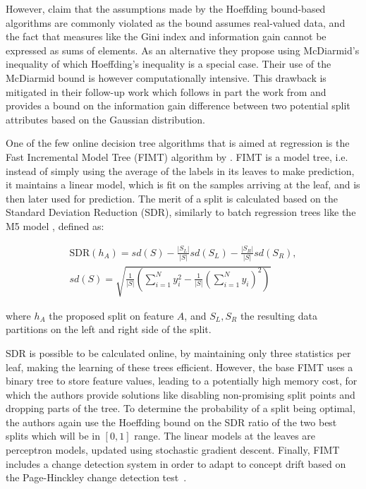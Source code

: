 However, \citet{vfdt-mcdiarmid} claim that the assumptions made
by the Hoeffding bound-based algorithms are commonly violated as the bound assumes
real-valued data, and the fact that measures like the Gini index and information
gain cannot be expressed as sums of elements. As an alternative they propose
using McDiarmid's inequality of which Hoeffding's inequality is a special case.
Their use of the McDiarmid
bound is however computationally intensive. This drawback is mitigated
in their follow-up work \cite{vfdt-gaussian} which follows in part the work from \citet{vfdt-normal}
and provides a bound on the information gain difference between two potential
split attributes based on the Gaussian distribution.

One of the few online decision tree algorithms that is aimed at regression
is the Fast Incremental Model Tree (FIMT) algorithm by \citet{fimt}. FIMT
is a model tree, i.e. instead of simply using the average of the labels
in its leaves to make prediction, it maintains a linear model, which is
fit on the samples arriving at the leaf, and is then later used for prediction.
The merit of a split is calculated based on the Standard Deviation Reduction (SDR),
similarly to batch regression trees like the M5 model \cite{m5-tree}, defined as:

\begin{equation}
	\begin{split}
		\text{SDR}(h_A)=sd(S)-\frac{|S_L|}{|S|}sd\left(S_{L}\right)-\frac{|S_R|}{|S|}sd\left(S_{R}\right), \\
		sd(S) = \sqrt{\frac{1}{|S|}\left(\sum_{i=1}^{N}y_{i}^{2}-\frac{1}{|S|}\left(\sum_{i=1}^{N}y_{i}\right)^{2}\right)}
	\end{split}
\end{equation}

\noindent
where $h_A$ the proposed split on feature $A$, and $S_L, S_R$ the resulting
data partitions on the left and right side of the split.

SDR is possible to be calculated online, by maintaining only three statistics per leaf,
making the learning of these trees efficient. However, the base FIMT uses a binary tree
to store feature values, leading to a potentially high memory cost, for which
the authors provide solutions like disabling non-promising split points and dropping
parts of the tree. To determine the
probability of a split being optimal, the authors again use the Hoeffding bound
on the SDR ratio of the two best splits which will be in $[0, 1]$ range.
The linear models at the leaves are perceptron models, updated using stochastic
gradient descent.  Finally, FIMT includes a change detection system in order to
adapt to concept drift 
based on the Page-Hinckley change detection test~\cite{ph-test, ph-test2}.


